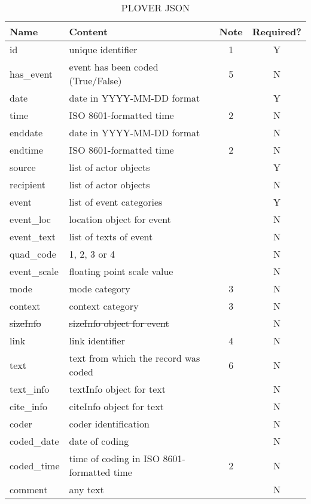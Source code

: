 \documentclass[11pt]{report}
\begin{document}
\begin{table}[htp]
\caption{PLOVER JSON }
\begin{center}
\begin{tabular}{|l|l|c|c|}
\hline
Name & Content & Note & Required? \\
\hline
id & unique identifier & 1 & Y\\
has\_event & event has been coded (True/False) & 5 & N\\
date & date in YYYY-MM-DD format &  & Y\\
time & ISO 8601-formatted time & 2 & N\\
enddate & date in YYYY-MM-DD format &  & N\\
endtime & ISO 8601-formatted time & 2 & N\\
source & list of actor objects & & Y \\
recipient & list of actor objects & & N \\
event & list of event categories & & Y \\
event\_loc & location object for event & & N \\
event\_text & list of texts of event & & N \\
quad\_code & 1, 2, 3 or 4 & & N \\
event\_scale & floating point scale value & & N \\
mode & mode category & 3 & N \\
context & context category & 3 & N \\
\sout{sizeInfo} & \sout{sizeInfo object for event}  & & N \\
link &  link identifier & 4 & N \\
text & text from which the record was coded & 6 & N \\
text\_info & textInfo object for text & & N \\
cite\_info & citeInfo object for text & & N \\
coder &  coder identification & & N \\
coded\_date & date of coding & & N \\
coded\_time & time of coding in ISO 8601-formatted time & 2 & N\\
comment &  any text & & N \\
\hline
\end{tabular}
\end{center}
\label{tab:json}
\end{table}
\end{document}
